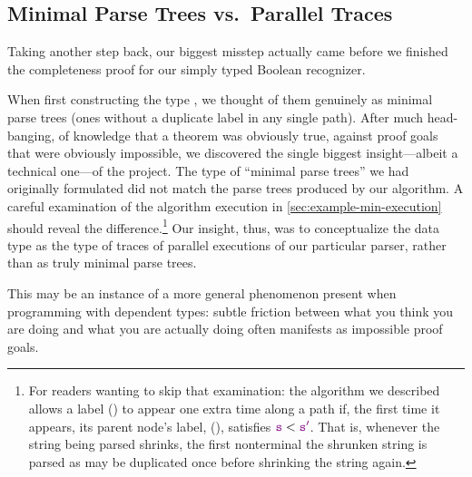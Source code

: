   \subsection{Minimal Parse Trees vs.~Parallel Traces}
    Taking another step back, our biggest misstep actually came before we finished the completeness proof for our simply typed Boolean recognizer.

    When first constructing the type , we thought of them genuinely as minimal parse trees (ones without a duplicate label in any single path).  After much head-banging, of knowledge that a theorem was obviously true, against proof goals that were obviously impossible, we discovered the single biggest insight---albeit a technical one---of the project.  The type of ``minimal parse trees'' we had originally formulated did not match the parse trees produced by our algorithm.  A careful examination of the algorithm execution in \autoref{sec:example-min-execution} should reveal the difference.\footnote{For readers wanting to skip that examination: the algorithm we described allows a label () to appear one extra time along a path if, the first time it appears, its parent node's label, (), satisfies $\textcolor{violet}{\texttt{s}} < \textcolor{violet}{\texttt{s$'$}}$.  That is, whenever the string being parsed shrinks, the first nonterminal the shrunken string is parsed as may be duplicated once before shrinking the string again.}  Our insight, thus, was to conceptualize the data type as the type of traces of parallel executions of our particular parser, rather than as truly minimal parse trees.

    This may be an instance of a more general phenomenon present when programming with dependent types: subtle friction between what you think you are doing and what you are actually doing often manifests as impossible proof goals.